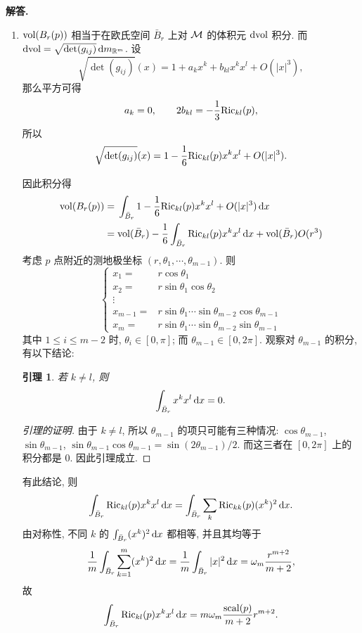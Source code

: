 \documentclass{ctexart}
\newenvironment{solution}{\par\noindent\textbf{解答. }}{\par}
\newtheorem*{lemma*}{引理}
\begin{document}
\begin{solution}
    \begin{enumerate}
        \item $\mathrm{vol} (B_r (p))$ 相当于在欧氏空间 $\bar{B}_r$ 上对 $\mathcal{M}$ 的体积元 $\mathop{}\!\mathrm{d} \mathrm{vol}$ 积分. 而 $\mathop{}\!\mathrm{d} \mathrm{vol} = \sqrt{\det (g_{ij})} \mathop{}\!\mathrm{d} m_{\mathbb{R}^m}$. 设 
        \[
            \sqrt{\det (g_{ij})}(x) = 1 + a_k x^k + b_{kl}x^k x^l + O(|x|^3),
        \]
        那么平方可得
        \[
            a_k = 0, \qquad 2b_{kl} = - \dfrac{1}{3}\mathrm{Ric}_{kl}(p),
        \]
        所以
        \[
            \sqrt{\det (g_{ij})}(x) = 1 - \dfrac{1}{6}\mathrm{Ric}_{kl}(p)x^k x^l + O(|x|^3).
        \]
        
        因此积分得
        \[
            \begin{aligned}
                \mathrm{vol} (B_r (p)) ={} & \int_{\bar{B}_r} 1 - \dfrac{1}{6}\mathrm{Ric}_{kl}(p)x^k x^l + O(|x|^3) \mathop{}\!\mathrm{d} x \\
                ={} & \mathrm{vol}(\bar{B}_r) - \dfrac{1}{6}\int_{\bar{B}_r}\mathrm{Ric}_{kl}(p)x^k x^l \mathop{}\!\mathrm{d} x + \mathrm{vol}(\bar{B}_r)O(r^3) \\
            \end{aligned}
        \]
        考虑 $p$ 点附近的测地极坐标 $(r, \theta_1, \cdots, \theta_{m - 1})$. 则
        \[
            \left\{
            \begin{aligned}
                x_1 ={} & r \cos \theta_1 \\
                x_2 ={} & r \sin \theta_1 \cos \theta_2 \\
                \vdots{} & \\
                x_{m - 1} ={} & r \sin \theta_1 \cdots \sin \theta_{m - 2} \cos \theta_{m - 1} \\
                x_m ={} & r \sin \theta_1 \cdots \sin \theta_{m - 2} \sin \theta_{m - 1} 
            \end{aligned}
            \right.
        \]
        其中 $1 \leqslant i \leqslant m - 2$ 时, $\theta_i \in [0, \pi]$; 而 $\theta_{m - 1} \in [0, 2\pi]$. 观察对 $\theta_{m - 1}$ 的积分, 有以下结论:
        \begin{lemma*}
            若 $k \not= l$, 则
            \[
                \int_{\bar{B}_r}x^k x^l \mathop{}\!\mathrm{d} x = 0.
            \]
        \end{lemma*}
        \begin{proof}[引理的证明]
            由于 $k \not= l$, 所以 $\theta_{m - 1}$ 的项只可能有三种情况: $\cos \theta_{m - 1}$, $\sin \theta_{m - 1}$, $\sin \theta_{m - 1}\cos \theta_{m - 1} = \sin (2\theta_{m - 1}) / 2$. 而这三者在 $[0, 2\pi]$ 上的积分都是 $0$. 因此引理成立.
        \end{proof}
        有此结论, 则 
        \[
            \int_{\bar{B}_r}\mathrm{Ric}_{kl}(p)x^k x^l \mathop{}\!\mathrm{d} x = \int_{\bar{B}_r}\sum_{k}\mathrm{Ric}_{kk}(p)(x^k)^2 \mathop{}\!\mathrm{d} x.
        \]
        由对称性, 不同 $k$ 的 $\int_{\bar{B}_r}(x^k)^2 \mathop{}\!\mathrm{d} x$ 都相等, 并且其均等于
        \[
            \dfrac{1}{m}\int_{\bar{B}_r} \sum_{k = 1}^{m}(x^k)^2 \mathop{}\!\mathrm{d} x = \dfrac{1}{m}\int_{\bar{B}_r} |x|^2 \mathop{}\!\mathrm{d} x = \omega_m \dfrac{r^{m + 2}}{m + 2},
        \]
        故
        \[
            \int_{\bar{B}_r}\mathrm{Ric}_{kl}(p)x^k x^l \mathop{}\!\mathrm{d} x = m\omega_m \dfrac{\mathrm{scal}(p)}{m + 2}r^{m + 2}.
        \]


\end{enumerate}
\end{solution}
\end{document}
